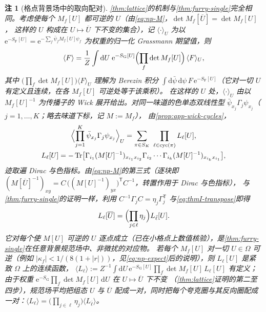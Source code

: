 \documentclass[UTF8,a4paper,11pt,fontset=fandol]{ctexart}
\theoremstyle{cplain}
\theoremstyle{cdefinition}
\theoremstyle{cremark}
\newtheorem{remark}[theorem]{注}
\numberwithin{equation}{section}
\DeclareMathOperator{\Tr}{Tr}
\newcommand{\dd}{\mathrm{d}}                         %
\newcommand{\tp}{\mathsf{T}}                         %
\newcommand{\ee}{\mathrm{e}}                        %
\begin{document}
\begin{remark}[格点背景场中的取向配对]\label{rem:np-lattice-loops}
\cref{thm:lattice}的机制与\cref{thm:furry-single}完全相同。考虑使每个 $M_f[U]$ 都可逆的 $U$（由\cref{eq:np-M}，$\det M_f[\overline U]=\det M_f[U]$，
这样的 $U$ 构成在 $U\mapsto\overline U$ 下不变的集合），记 $\langle\cdot\rangle_U$ 为以 $\ee^{-S_{\mathrm F}[U]}=\ee^{-\sum_f\bar\psi_fM_f[U]\psi_f}$ 为权重的归一化 Grassmann 期望值，则
\begin{equation*}
\langle F\rangle=\frac1Z\int\dd U\;\ee^{-S_{\mathrm G}[U]}\Bigl(\prod_f\det M_f[U]\Bigr)\,\langle F\rangle_U,
\end{equation*}
其中 $\bigl(\prod_f\det M_f[U]\bigr)\langle F\rangle_U$ 理解为 Berezin 积分 $\int\dd\bar\psi\,\dd\psi\,F\,\ee^{-S_{\mathrm F}[U]}$（它对一切 $U$ 有定义且连续，在各 $M_f[U]$ 可逆处等于该乘积）。
在这样的 $U$ 处，$\langle\cdot\rangle_U$ 由以 $M_f[U]^{-1}$ 为传播子的 Wick 展开给出。对同一味道的色单态双线性型 $\bar\psi_{x_j}\Gamma_j\psi_{x_j}$（$j=1,\dots,K$；略去味道下标，记 $M:=M_f$），
由\cref{prop:app-wick-cycles}，
\begin{gather*}
\Bigl\langle\prod_{j=1}^K\bar\psi_{x_j}\Gamma_j\psi_{x_j}\Bigr\rangle_U=\sum_{\pi\in S_K}\ \prod_{\ell\in\mathrm{cyc}(\pi)}L_\ell[U],\\
L_\ell[U]=-\Tr\bigl[\Gamma_{i_1}(M[U]^{-1})_{x_{i_1}x_{i_2}}\Gamma_{i_2}\cdots\Gamma_{i_k}(M[U]^{-1})_{x_{i_k}x_{i_1}}\bigr],
\end{gather*}
迹取遍 Dirac 与色指标。由\cref{eq:np-M}的第三式（逐块即 $(M[\overline U]^{-1})_{xy}=C\,\bigl((M[U]^{-1})_{yx}\bigr)^{\tp}C^{-1}$，转置作用于 Dirac 与色指标），
与\cref{thm:furry-single}的证明一样，利用 $C^{-1}\Gamma_jC=\eta_j\Gamma_j^{\tp}$ 与\cref{eq:thmI-transpose}即得
\begin{equation}\label{eq:np-lattice-loop}
L_\ell[\overline U]=\Bigl(\prod_{j\in\ell}\eta_j\Bigr)L_{\bar\ell}[U].
\end{equation}
它对每个使 $M[U]$ 可逆的 $U$ 逐点成立（已在小格点上数值核验），是\cref{thm:furry-single}在任意背景规范场中、非微扰的对应物。
若每个 $M_f[U]$ 对一切 $U\in\Omega$ 可逆（例如 $|\kappa_f|<1/(8(1+|r|))$，见\cref{eq:np-expect}后的说明），则 $L_\ell[U]$ 是紧致 $\Omega$ 上的连续函数，
$\langle L_\ell\rangle:=Z^{-1}\int\dd U\,\ee^{-S_{\mathrm G}[U]}\prod_f\det M_f[U]\,L_\ell[U]$ 有定义；由于权重 $\ee^{-S_{\mathrm G}}\prod_f\det M_f[U]\,\dd U$ 在 $U\mapsto\overline U$ 下不变
（\cref{thm:lattice}证明的第二至四步），规范场平均把组态 $U$ 与 $\overline U$ 配成一对，同时把每个夸克圈与其反向圈配成一对：$\langle L_\ell\rangle=\bigl(\prod_{j\in\ell}\eta_j\bigr)\langle L_{\bar\ell}\rangle$。

\end{remark}
\end{document}
